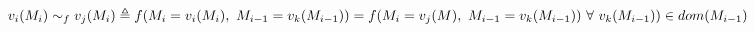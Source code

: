 \documentclass[12pt]{article}
\begin{document}
\maketitle

\begin{equation}
v_i(M_i) \sim_f v_j(M_i) \triangleq f(M_i = v_i(M_i),\ M_{i-1} = v_k(M_{i-1})) = \\
f(M_i = v_j(M),\ M_{i-1} = v_k(M_{i-1}))\ \forall\ v_k(M_{i-1})) \in dom(M_{i-1})
\end{equation}
\end{document}
